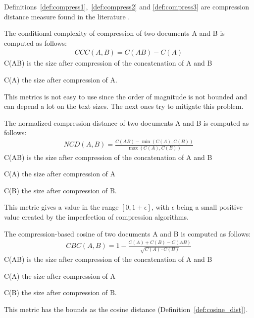 Definitions~\ref{def:compress1},~\ref{def:compress2} and \ref{def:compress3} are compression distance measure found in the literature  \cite{comparing_compression} \cite{savoy_stylo}.

\begin{definition}
  The conditional complexity of compression of two documents A and B is computed as follows:
  \begin{gather*}
    CCC(A, B) = C(AB) - C(A)
  \end{gather*}
  C(AB) is the size after compression of the concatenation of A and B

  C(A) the size after compression of A.

  This metrics is not easy to use since the order of magnitude is not bounded and can depend a lot on the text sizes.
  The next ones try to mitigate this problem.
\end{definition}

\begin{definition}
  The normalized compression distance of two documents A and B is computed as follows:
  \begin{gather*}
    NCD(A, B) = \frac{C(AB) - \min(C(A), C(B))}{\max(C(A), C(B))}
  \end{gather*}
  C(AB) is the size after compression of the concatenation of A and B

  C(A) the size after compression of A

  C(B) the size after compression of B.

  This metric gives a value in the range $\left[0, 1+\epsilon\right]$, with $\epsilon$ being a small positive value created by the imperfection of compression algorithms.
\end{definition}

\begin{definition}
  The compression-based cosine of two documents A and B is computed as follows:
  \begin{gather*}
    CBC(A, B) = 1 - \frac{C(A) + C(B) - C(AB)}{\sqrt{C(A) \cdot C(B)}}
  \end{gather*}
  C(AB) is the size after compression of the concatenation of A and B

  C(A) the size after compression of A

  C(B) the size after compression of B.

  This metric has the bounds as the cosine distance (Definition~\ref{def:cosine_dist}).
\end{definition}

